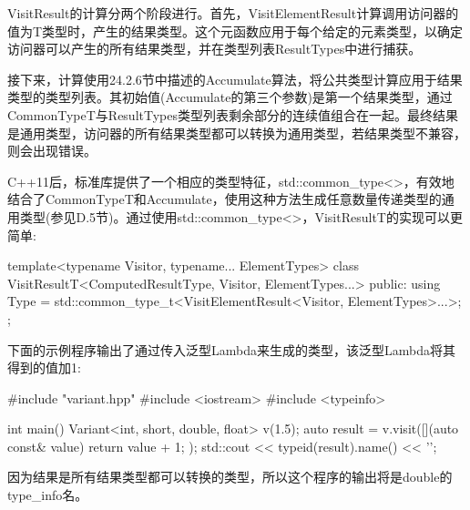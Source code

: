 VisitResult的计算分两个阶段进行。首先，VisitElementResult计算调用访问器的值为T类型时，产生的结果类型。这个元函数应用于每个给定的元素类型，以确定访问器可以产生的所有结果类型，并在类型列表ResultTypes中进行捕获。

接下来，计算使用24.2.6节中描述的Accumulate算法，将公共类型计算应用于结果类型的类型列表。其初始值(Accumulate的第三个参数)是第一个结果类型，通过CommonTypeT与ResultTypes类型列表剩余部分的连续值组合在一起。最终结果是通用类型，访问器的所有结果类型都可以转换为通用类型，若结果类型不兼容，则会出现错误。

C++11后，标准库提供了一个相应的类型特征，std::common\_type<>，有效地结合了CommonTypeT和Accumulate，使用这种方法生成任意数量传递类型的通用类型(参见D.5节)。通过使用std::common\_type<>，VisitResultT的实现可以更简单:

\begin{cpp}
template<typename Visitor, typename... ElementTypes>
class VisitResultT<ComputedResultType, Visitor, ElementTypes...>
{
	public:
	using Type =
		std::common_type_t<VisitElementResult<Visitor, ElementTypes>...>;
};
\end{cpp}

下面的示例程序输出了通过传入泛型Lambda来生成的类型，该泛型Lambda将其得到的值加1:

\begin{cpp}
#include "variant.hpp"
#include <iostream>
#include <typeinfo>

int main()
{
	Variant<int, short, double, float> v(1.5);
	auto result = v.visit([](auto const& value) {
							return value + 1;
						});
	std::cout << typeid(result).name() << '\n';
}
\end{cpp}

因为结果是所有结果类型都可以转换的类型，所以这个程序的输出将是double的type\_info名。







